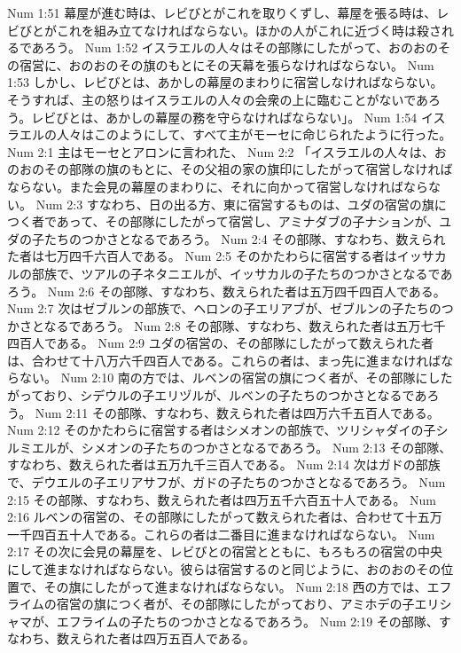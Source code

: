Num 1:51  幕屋が進む時は、レビびとがこれを取りくずし、幕屋を張る時は、レビびとがこれを組み立てなければならない。ほかの人がこれに近づく時は殺されるであろう。
Num 1:52  イスラエルの人々はその部隊にしたがって、おのおのその宿営に、おのおのその旗のもとにその天幕を張らなければならない。
Num 1:53  しかし、レビびとは、あかしの幕屋のまわりに宿営しなければならない。そうすれば、主の怒りはイスラエルの人々の会衆の上に臨むことがないであろう。レビびとは、あかしの幕屋の務を守らなければならない」。
Num 1:54  イスラエルの人々はこのようにして、すべて主がモーセに命じられたように行った。
Num 2:1  主はモーセとアロンに言われた、
Num 2:2  「イスラエルの人々は、おのおのその部隊の旗のもとに、その父祖の家の旗印にしたがって宿営しなければならない。また会見の幕屋のまわりに、それに向かって宿営しなければならない。
Num 2:3  すなわち、日の出る方、東に宿営するものは、ユダの宿営の旗につく者であって、その部隊にしたがって宿営し、アミナダブの子ナションが、ユダの子たちのつかさとなるであろう。
Num 2:4  その部隊、すなわち、数えられた者は七万四千六百人である。
Num 2:5  そのかたわらに宿営する者はイッサカルの部族で、ツアルの子ネタニエルが、イッサカルの子たちのつかさとなるであろう。
Num 2:6  その部隊、すなわち、数えられた者は五万四千四百人である。
Num 2:7  次はゼブルンの部族で、ヘロンの子エリアブが、ゼブルンの子たちのつかさとなるであろう。
Num 2:8  その部隊、すなわち、数えられた者は五万七千四百人である。
Num 2:9  ユダの宿営の、その部隊にしたがって数えられた者は、合わせて十八万六千四百人である。これらの者は、まっ先に進まなければならない。
Num 2:10  南の方では、ルベンの宿営の旗につく者が、その部隊にしたがっており、シデウルの子エリヅルが、ルベンの子たちのつかさとなるであろう。
Num 2:11  その部隊、すなわち、数えられた者は四万六千五百人である。
Num 2:12  そのかたわらに宿営する者はシメオンの部族で、ツリシャダイの子シルミエルが、シメオンの子たちのつかさとなるであろう。
Num 2:13  その部隊、すなわち、数えられた者は五万九千三百人である。
Num 2:14  次はガドの部族で、デウエルの子エリアサフが、ガドの子たちのつかさとなるであろう。
Num 2:15  その部隊、すなわち、数えられた者は四万五千六百五十人である。
Num 2:16  ルベンの宿営の、その部隊にしたがって数えられた者は、合わせて十五万一千四百五十人である。これらの者は二番目に進まなければならない。
Num 2:17  その次に会見の幕屋を、レビびとの宿営とともに、もろもろの宿営の中央にして進まなければならない。彼らは宿営するのと同じように、おのおのその位置で、その旗にしたがって進まなければならない。
Num 2:18  西の方では、エフライムの宿営の旗につく者が、その部隊にしたがっており、アミホデの子エリシャマが、エフライムの子たちのつかさとなるであろう。
Num 2:19  その部隊、すなわち、数えられた者は四万五百人である。
